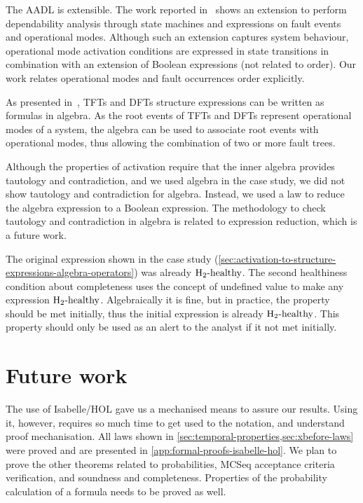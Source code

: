 
The \ac{AADL} is extensible. 
The work reported in~\cite{SAEAS55061A} shows an extension to perform dependability analysis through state machines and expressions on fault events and operational modes.
Although such an extension captures system behaviour, operational mode activation conditions are expressed in state transitions in combination with an extension of Boolean expressions (not related to order).
Our work relates operational modes and fault occurrences order explicitly.

As presented in~\cite{DM2016}, \acp{TFT} and \acp{DFT} structure expressions can be written as formulas in \ac{algebra}.
As the root events of \acp{TFT} and \acp{DFT} represent operational modes of a system, the \ac{algebra} can be used to associate root events with operational modes, thus allowing the combination of two or more fault trees.

Although the properties of \ac{activation} require that the inner algebra provides tautology and contradiction, and we used \ac{algebra} in the case study, we did not show tautology and contradiction for \ac{algebra}. 
Instead, we used a law to reduce the \ac{algebra} expression to a Boolean expression.
The methodology to check tautology and contradiction in \ac{algebra} is related to expression reduction, which is a future work.

The original expression shown in the case study (\cref{sec:activation-to-structure-expressions-algebra-operators}) was already $\healthy[2]$.
The second healthiness condition about completeness uses the concept of undefined value to make any expression $\healthy[2]$.
Algebraically it is fine, but in practice, the property should be met initially, thus the initial expression is already $\healthy[2]$.
This property should only be used as an alert to the analyst if it not met initially.

\section{Future work}

The use of Isabelle/HOL gave us a mechanised means to assure our results.
Using it, however, requires so much time to get used to the notation, and understand proof mechanisation.
All laws shown in \cref{sec:temporal-properties,sec:xbefore-laws} were proved and are presented in \cref{app:formal-proofs-isabelle-hol}.
We plan to prove the other theorems related to probabilities, \ac{MCSeq} acceptance criteria verification, and soundness and completeness.
Properties of the probability calculation of a formula needs to be proved as well.

